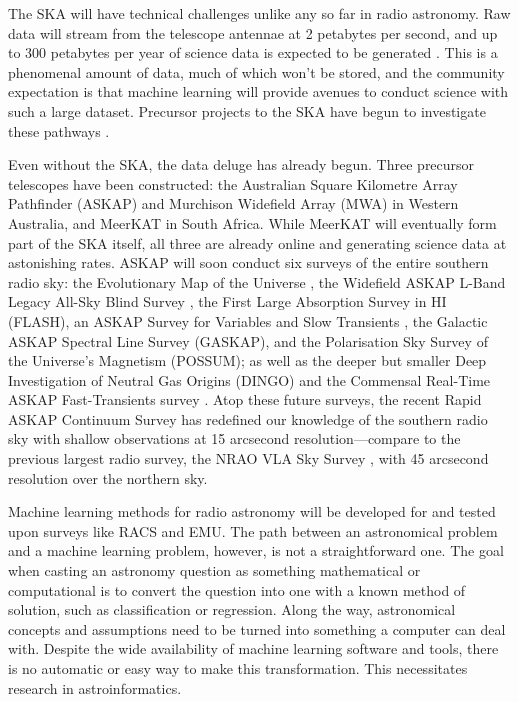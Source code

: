 \documentclass[11pt, a4paper]{book}
\begin{document}
The SKA will have technical challenges unlike any so far in radio astronomy. Raw data will stream from the telescope antennae at 2 petabytes per second, and up to 300 petabytes per year of science data is expected to be generated \citep{diamond_ska_2017}. This is a phenomenal amount of data, much of which won't be stored, and the community expectation is that machine learning will provide avenues to conduct science with such a large dataset. Precursor projects to the SKA have begun to investigate these pathways \citep[e.g.][]{bonaldi_square_2020,kapinska_emu_2020,mostert_unveiling_2020}.

Even without the SKA, the data deluge has already begun. Three precursor telescopes have been constructed: the Australian Square Kilometre Array Pathfinder \linebreak(ASKAP) and Murchison Widefield Array (MWA) in Western Australia, and MeerKAT in South Africa. While MeerKAT will eventually form part of the SKA itself, all three are already online and generating science data at astonishing rates. ASKAP will soon conduct six surveys of the entire southern radio sky: the Evolutionary Map of the Universe \citep[EMU;][]{norris11,kapinska_emu_2020}, the Widefield ASKAP L-Band Legacy All-Sky Blind Survey \citep[WALLABY]{koribalski_wallaby_2020}, the First Large Absorption Survey in HI (FLASH), an ASKAP Survey for Variables and Slow Transients \citep[VAST;][]{murphy_vast_2013}, the Galactic ASKAP Spectral Line Survey (GASKAP), and the Polarisation Sky Survey of the Universe's Magnetism (POSSUM); as well as the deeper but smaller Deep Investigation of Neutral Gas Origins (DINGO) and the Commensal Real-Time ASKAP Fast-Transients survey \citep[CRAFT;][]{macquart10craft}. Atop these future surveys, the recent Rapid ASKAP Continuum Survey \citep[RACS;][]{mcconnell_rapid_2020} has redefined our knowledge of the southern radio sky with shallow observations at 15 arcsecond resolution---compare to the previous largest radio survey, the NRAO VLA Sky Survey \citep[NVSS;][]{condon98nvss}, with 45 arcsecond resolution over the northern sky.

Machine learning methods for radio astronomy will be developed for and tested upon surveys like RACS and EMU. The path between an astronomical problem and a machine learning problem, however, is not a straightforward one. The goal when casting an astronomy question as something mathematical or computational is to convert the question into one with a known method of solution, such as classification or regression. Along the way, astronomical concepts and assumptions need to be turned into something a computer can deal with. Despite the wide availability of machine learning software and tools, there is no automatic or easy way to make this transformation. This necessitates research in astroinformatics.
\end{document}
